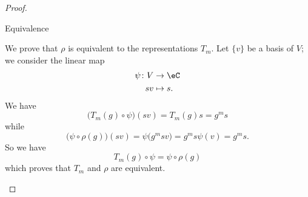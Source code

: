 \begin{proof}
\begin{subproof}
        \item[Equivalence]

            We prove that \( \rho\) is equivalent to the representations \( T_m\). Let \( \{ v \}\) be a basis of \( V\); we consider the linear map
            \begin{equation}
                \begin{aligned}
                    \psi\colon V&\to \eC \\
                    sv&\mapsto s. 
                \end{aligned}
            \end{equation}
            We have
            \begin{equation}
                \big( T_m(g)\circ \psi \big)(sv)=T_m(g)s=g^ms
            \end{equation}
            while
            \begin{equation}
                \big( \psi\circ\rho(g) \big)(sv)=\psi\big( g^msv \big)=g^ms\psi(v)=g^ms.
            \end{equation}
            So we have
            \begin{equation}
                T_m(g)\circ \psi=\psi\circ\rho(g)
            \end{equation}
            which proves that \( T_m\) and \( \rho\) are equivalent.
    \end{subproof}
\end{proof}

